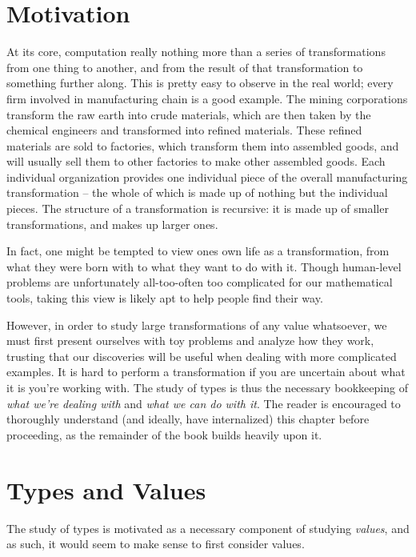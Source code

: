 \documentclass[12pt]{book}
\begin{document}
\section{Motivation}
At its core, computation really nothing more than a series of
transformations from one thing to another, and from the result of that transformation to something further along. This
is pretty easy to observe in the real world; every firm involved in manufacturing chain is a good example. The mining
corporations transform the raw earth into crude materials, which are then taken by the chemical engineers and
transformed into refined materials. These refined materials are sold to factories, which transform them into assembled
goods, and will usually sell them to other factories to make other assembled goods. Each individual organization
provides one individual piece of the overall manufacturing transformation -- the whole of which is made up of nothing
but the individual pieces. The structure of a transformation is recursive: it is made up of smaller transformations, and
makes up larger ones.

In fact, one might be tempted to view ones own life as a transformation, from what they were born with to what they want
to do with it. Though human-level problems are unfortunately all-too-often too complicated for our
mathematical tools, taking this view is likely apt to help people find their
way.

However, in order to study large transformations of any value whatsoever, we must first present ourselves with toy
problems and analyze how they work, trusting that our discoveries will be useful when dealing with more complicated
examples. It is hard to perform a transformation if you are uncertain about what it is you're working with. The study of
types is thus the necessary bookkeeping of \textit{what we're dealing with} and \textit{what we can do with it}. The
reader is encouraged to thoroughly understand (and ideally, have internalized) this chapter before proceeding, as the
remainder of the book builds heavily upon it.


\section{Types and Values}
The study of types is motivated as a necessary component of studying \textit{values}, and as such, it would seem to make
sense to first consider values.
\end{document}
